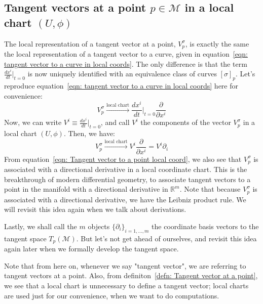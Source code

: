     \subsection{Tangent vectors at a point $p\in\mathcal{M}$ in a local
    chart $(U,\phi)$}
      The local representation of a tangent vector at a point,
      $V^{\sigma}_{p}$, is exactly the same the local representation of a
      tangent vector to a curve, given in equation~\ref{eqn: tangent vector
      to a curve in local coords}. The only difference is that the term
      $\frac{dx^i}{dt}\Bigr|_{t=0}$ is now uniquely identified with an
      equivalence class of curves $[\sigma]_p$. Let's reproduce
      equation~\ref{eqn: tangent vector to a curve in local coords} here
      for convenience:
      \begin{equation*}
        V^{\sigma}_{p} \xrightarrow{\text{local chart}}
        \frac{dx^i}{dt}\Bigr|_{t=0}\frac{\partial}{\partial x^i}
      \end{equation*} Now, we can write $V^i \equiv
      \frac{dx^i}{dt}\Bigr|_{t=0}$, and call $V^i$ the components of the
      vector $V^{\sigma}_{p}$ in a local chart $(U,\phi)$. Then, we have:
      \begin{equation}
        \label{eqn: Tangent vector to a point local coord}
        V^{\sigma}_{p} \xrightarrow{\text{local chart}} V^i
        \frac{\partial}{\partial x^i} = V^i \partial_i
      \end{equation}
      From equation~\ref{eqn: Tangent vector to a point local coord}, we
      also see that $V^{\sigma}_{p}$ is associated with a directional
      derivative in a local coordinate chart. This is the breakthrough of
      modern differential geometry, to associate tangent vectors to a point
      in the manifold with a directional derivative in $\mathbb{R}^m$. Note
      that because $V^{\sigma}_{p}$ is associated with a directional
      derivative, we have the Leibniz product rule. We will revisit this idea again when we talk about derivations.

      Lastly, we shall call the $m$ objects $\{\partial_i\}_{i=1,...,m}$
      the coordinate basis vectors to the tangent space $T_p(\mathcal{M})$.
      But let's not get ahead of ourselves, and revisit this idea again
      later when we formally develop the tangent space.

      Note that from here on, whenever we say "tangent vector", we are
      referring to tangent vectors at a point. Also, from
      definiton~\ref{defn: Tangent vector at a point}, we see that a local
      chart is unnecessary to define a tangent vector; local charts are
      used just for our convenience, when we want to do computations.
